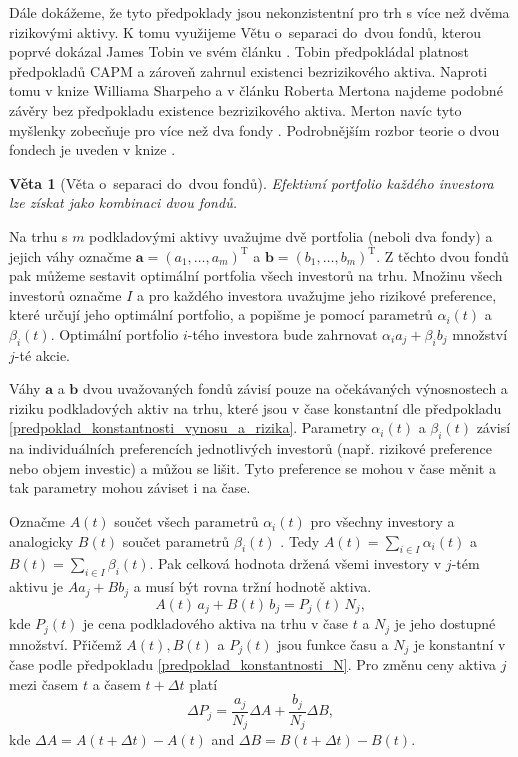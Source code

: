 \documentclass[a4paper,12pt]{report}
\newtheorem{veta}{Věta}
\theoremstyle{definition} \newtheorem{definice}[veta]{Definice}
\theoremstyle{remark}
\begin{document}
Dále dokážeme, že tyto předpoklady jsou nekonzistentní pro trh s více než dvěma rizikovými aktivy.
K tomu využijeme Větu o~separaci do~dvou fondů, kterou poprvé dokázal  James Tobin ve svém článku \cite{tobin}. 
Tobin předpokládal platnost předpokladů CAPM a zároveň zahrnul existenci bezrizikového aktiva.
Naproti tomu v knize Williama Sharpeho \cite{sharpe} a v článku Roberta Mertona \cite{merton} najdeme podobné závěry bez předpokladu existence bezrizikového aktiva.
Merton navíc tyto myšlenky zobecňuje pro více než dva fondy \cite{merton1973}.
Podrobnějším rozbor teorie o dvou fondech je uveden v knize \cite{cass1970structure}.
\begin{veta}[Věta o~separaci do~dvou fondů]
Efektivní portfolio každého investora lze získat jako kombinaci dvou fondů.
\end{veta}

Na trhu s $m$ podkladovými aktivy uvažujme dvě portfolia (neboli dva fondy) a jejich váhy označme $\boldsymbol{a}=(a_1,\dots,a_m)^\mathrm{T}$ a $\boldsymbol{b}=(b_1,\dots,b_m)^\mathrm{T}$. Z těchto dvou fondů pak můžeme sestavit optimální portfolia všech investorů na trhu.
Množinu všech investorů označme $I$ a pro každého investora uvažujme jeho rizikové preference, které určují jeho optimální portfolio, a popišme je pomocí parametrů $\alpha_i(t)$ a $\beta_i(t)$.
Optimální portfolio $i$-tého investora bude zahrnovat $\alpha_ia_j+\beta_ib_j$ množství $j$-té akcie.

Váhy $\boldsymbol{a}$ a  $\boldsymbol{b}$ dvou uvažovaných fondů závisí pouze na očekávaných výnosnostech a riziku podkladových aktiv na trhu, které jsou v čase konstantní dle předpokladu \ref{predpoklad_konstantnosti_vynosu_a_rizika}.
Parametry $\alpha_i(t)$ a $\beta_i(t)$ závisí na individuálních preferencích jednotlivých investorů (např. rizikové preference nebo objem investic) a můžou se lišit. Tyto preference se mohou v čase měnit a tak parametry mohou záviset i na čase.

Označme $A(t)$ součet všech parametrů $\alpha_i(t)$ pro všechny investory a analogicky $B(t)$ součet parametrů $\beta_i(t)$ .
Tedy $A(t)=\sum_{i\in I}\alpha_i(t)$ a $B(t)=\sum_{i\in I}\beta_i(t)$.
Pak celková hodnota držená všemi investory v $j$-tém aktivu je $Aa_j+Bb_j$ a musí být rovna tržní hodnotě aktiva.
$$A(t)\,a_j+B(t)\,b_j=P_j(t)\,N_j,$$
kde $P_j(t)$ je cena podkladového aktiva na trhu v čase $t$ a $N_j$ je jeho dostupné množství.
Přičemž $A(t),B(t)$ a $ P_j(t)$ jsou funkce času a $N_j$ je konstantní v čase podle předpokladu \ref{predpoklad_konstantnosti_N}.
Pro změnu ceny aktiva $j$ mezi časem $t$ a časem $t+\Delta t$ platí
\begin{displaymath}
\Delta P_j = \frac{a_j}{N_j}\Delta A + \frac{b_j}{N_j}\Delta B,
\end{displaymath}
kde $\Delta A = A(t+\Delta t) - A(t)$ and $\Delta B = B(t+\Delta t)- B(t)$.
\end{document}
